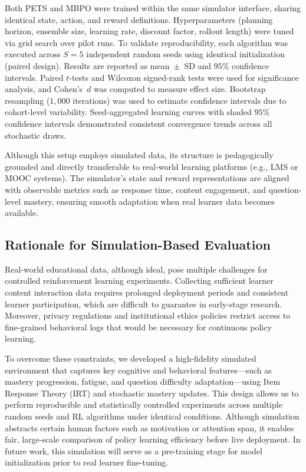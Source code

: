 \documentclass[preprint,12pt]{elsarticle}
\begin{document}
\begin{frontmatter}
Both PETS and MBPO were trained within the same simulator interface, sharing identical state, action, and reward definitions.  
Hyperparameters (planning horizon, ensemble size, learning rate, discount factor, rollout length) were tuned via grid search over pilot runs.  
To validate reproducibility, each algorithm was executed across $S=5$ independent random seeds using identical initialization (paired design).  
Results are reported as mean~$\pm$~SD and $95\%$ confidence intervals.  
Paired $t$-tests and Wilcoxon signed-rank tests were used for significance analysis, and Cohen’s~$d$ was computed to measure effect size.  
Bootstrap resampling ($1{,}000$ iterations) was used to estimate confidence intervals due to cohort-level variability.  
Seed-aggregated learning curves with shaded $95\%$ confidence intervals demonstrated consistent convergence trends across all stochastic draws.

Although this setup employs simulated data, its structure is pedagogically grounded and directly transferable to real-world learning platforms (e.g., LMS or MOOC systems).  
The simulator's state and reward representations are aligned with observable metrics such as response time, content engagement, and question-level mastery, ensuring smooth adaptation when real learner data becomes available.
\subsection{Rationale for Simulation-Based Evaluation}
Real-world educational data, although ideal, pose multiple challenges for controlled reinforcement learning experiments. Collecting sufficient learner content interaction data requires prolonged deployment periods and consistent learner participation, which are difficult to guarantee in early-stage research. Moreover, privacy regulations and institutional ethics policies restrict access to fine-grained behavioral logs that would be necessary for continuous policy learning.

To overcome these constraints, we developed a high-fidelity simulated environment that captures key cognitive and behavioral features—such as mastery progression, fatigue, and question difficulty adaptation—using Item Response Theory (IRT) and stochastic mastery updates. This design allows us to perform reproducible and statistically controlled experiments across multiple random seeds and RL algorithms under identical conditions. Although simulation abstracts certain human factors such as motivation or attention span, it enables fair, large-scale comparison of policy learning efficiency before live deployment. In future work, this simulation will serve as a pre-training stage for model initialization prior to real learner fine-tuning.


\end{frontmatter}
\end{document}
